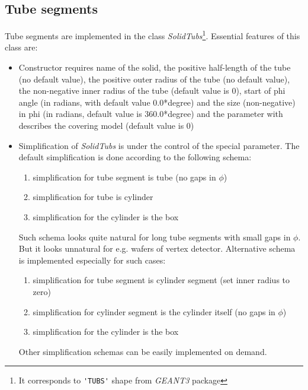    \subsection{ Tube    segments } 
Tube segments are implemented in the class 
{\it SolidTubs}\footnote{ It corresponds to \verb+'TUBS'+ shape from {\it GEANT3} package}. 
Essential features of this class are: 
\begin{itemize}
\item 
   Constructor requires name of the solid, the positive half-length of the tube (no default value), 
the positive outer radius of the tube (no default value), 
the non-negative inner radius of the tube (default value is 0),
start of phi angle (in radians, with default value 0.0*degree)
and the size (non-negative) in phi (in radians, default value is 360.0*degree) 
and the parameter with describes the covering model (default value is 0)
   \item 
Simplification of {\it SolidTubs } is under the control of the special parameter.
 The default simplification is done according to the following schema:
 \begin{enumerate}
  \item simplification for tube segment is tube  (no gaps in $\phi$)
  \item simplification for tube is cylinder  
  \item simplification for the cylinder is the box 
 \end{enumerate}
Such schema looks quite natural for long tube segments with small gaps in $\phi$. 
But it looks unnatural for e.g. wafers of vertex detector. 
Alternative schema is implemented especially for such cases:
 \begin{enumerate}
  \item simplification for tube segment is cylinder segment (set inner radius to zero)
  \item simplification for cylinder segment is the cylinder itself (no gaps in $\phi$)   
  \item simplification for the cylinder is the box 
 \end{enumerate}
Other simplification schemas can be easily implemented on demand. 
\end{itemize} 

